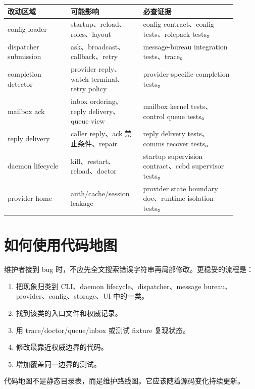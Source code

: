 \begin{longtable}{p{0.25\linewidth}p{0.28\linewidth}p{0.37\linewidth}}
\toprule
改动区域 & 可能影响 & 必查证据 \\
\midrule
config loader & startup、reload、roles、layout & config contract、config tests、rolepack tests。 \\
dispatcher submission & ask、broadcast、callback、retry & message-bureau integration tests、trace。 \\
completion detector & provider reply、watch terminal、retry policy & provider-specific completion tests。 \\
mailbox ack & inbox ordering、reply delivery、queue view & mailbox kernel tests、control queue tests。 \\
reply delivery & caller reply、ack 禁止条件、repair & reply delivery tests、comms recover tests。 \\
daemon lifecycle & kill、restart、reload、doctor & startup supervision contract、ccbd supervisor tests。 \\
provider home & auth/cache/session leakage & provider state boundary doc、runtime isolation tests。 \\
\bottomrule
\end{longtable}

\section{如何使用代码地图}

维护者接到 bug 时，不应先全文搜索错误字符串再局部修改。更稳妥的流程是：

\begin{enumerate}
  \item 把现象归类到 CLI、daemon lifecycle、dispatcher、message bureau、provider、config、storage、UI 中的一类。
  \item 找到该类的入口文件和权威记录。
  \item 用 trace/doctor/queue/inbox 或测试 fixture 复现状态。
  \item 修改最靠近权威边界的代码。
  \item 增加覆盖同一边界的测试。
\end{enumerate}

代码地图不是静态目录表，而是维护路线图。它应该随着源码变化持续更新。
